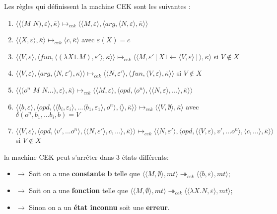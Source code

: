 \documentclass[10pt,a4paper]{report}
\begin{document}
Les règles qui définissent la machine CEK sont les suivantes :
\begin{enumerate}
\item $\langle\langle(M$ $N),\varepsilon\rangle,\overline{\kappa}\rangle \longmapsto_{cek} \langle \langle M,\varepsilon\rangle,\langle arg,\langle N,\varepsilon\rangle,\overline{\kappa}\rangle\rangle$	
\item $\langle\langle X,\varepsilon\rangle,\overline{\kappa}\rangle \longmapsto_{cek} \langle c,\overline{\kappa}\rangle$ avec $\varepsilon(X) = c$
\item $\langle\langle V,\varepsilon\rangle,\langle fun,\langle (\lambda X1.M),\varepsilon'\rangle,\overline{\kappa} \rangle \rangle \longmapsto_{cek} \langle \langle M,\varepsilon'[X1 \leftarrow \langle V,\varepsilon\rangle]\rangle,\overline{\kappa}\rangle$ si $V \notin X$
\item  $\langle \langle V,\varepsilon\rangle,\langle arg,\langle N,\varepsilon'\rangle,\kappa\rangle\rangle \longmapsto_{cek} \langle \langle N,\varepsilon'\rangle,\langle fun,\langle V,\varepsilon\rangle,\overline{\kappa}\rangle\rangle$ si $V \notin X$
\item $\langle\langle(o^{n}$ $M$ $N...),\varepsilon\rangle,\overline{\kappa}\rangle \longmapsto_{cek} \langle \langle M,\varepsilon\rangle,\langle opd,\langle o^{n}\rangle,\langle \langle N,\varepsilon\rangle,...\rangle,\overline{\kappa}\rangle\rangle$
\item $\langle  \langle b,\varepsilon\rangle,\langle opd,\langle \langle b_{i},\varepsilon_{i}\rangle,...\langle b_{1},\varepsilon_{1}\rangle ,o^{n}\rangle,\langle\rangle,\overline{\kappa}\rangle\rangle \longmapsto_{cek} \langle \langle V,\emptyset\rangle,\overline{\kappa}\rangle$ avec $\delta(o^{n},b_{1},...b_{i},b) = V$
\item $\langle \langle V,\varepsilon\rangle,\langle opd,\langle v',...o^{n}\rangle,\langle  \langle N,\varepsilon'\rangle,c,...\rangle,\overline{\kappa}\rangle\rangle \longmapsto_{cek} \langle \langle N,\varepsilon'\rangle,\langle opd,\langle  \langle V,\varepsilon\rangle,v',...o^{n}\rangle,\langle c,...\rangle,\overline{\kappa}\rangle\rangle$ si $V \notin X$
\end{enumerate}
\bigbreak


la machine CEK peut s'arrêter dans 3 états différents:
\begin{itemize}
\item[]$\longrightarrow$ Soit on a une \textbf{constante b} telle que $\langle \langle M,\emptyset\rangle,mt\rangle \twoheadrightarrow_{cek} \langle\langle b,\varepsilon\rangle,mt\rangle$;
\item[]$\longrightarrow$ Soit on a une \textbf{fonction} telle que $\langle \langle M,\emptyset\rangle,mt\rangle \twoheadrightarrow_{cek} \langle\langle \lambda X.N,\varepsilon\rangle,mt\rangle$;
\item[]$\longrightarrow$ Sinon on a un \textbf{état inconnu} soit une \textbf{erreur}.
\end{itemize}
\bigbreak
\end{document}
